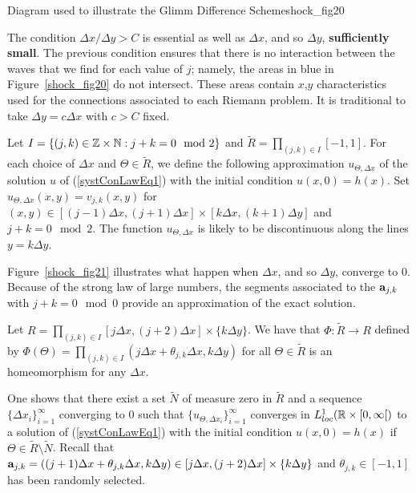 {Diagram used to illustrate the Glimm Difference Scheme}{shock_fig20}

The condition $\Delta x / \Delta y > C$ is essential as well as
$\Delta x$, and so $\Delta y$, {\bfseries sufficiently small}.
The previous condition ensures that there is no interaction between
the waves that we find for each value of $j$; namely, the areas
in blue in Figure~\ref{shock_fig20} do not intersect.  These areas contain
$x$,$y$ characteristics used for the connections associated to each
Riemann problem.  It is traditional to take $\Delta y = c \Delta x$ with
$c>C$ fixed.

Let $I = \{ (j,k) \in \mathbb{Z} \times \mathbb{N} : j+k = 0 \mod{2} \}$ and
$\displaystyle \tilde{R} = \prod_{(j,k) \in I} [-1,1]$.
For each choice of $\Delta x$ and $\Theta \in \tilde{R}$, we
define the following approximation $u_{\Theta, \Delta x}$ of the solution $u$ of
(\ref{systConLawEq1}) with the initial condition $u(x,0) = h(x)$.
Set $u_{\Theta,\Delta x}(x,y) = v_{j,k}(x,y)$ for
$(x,y) \in [(j-1)\Delta x, (j+1)\Delta x]\times [k\Delta x,(k+1)\Delta y]$
and $j+k = 0 \mod{2}$.  The function $u_{\Theta,\Delta x}$ is likely
to be discontinuous along the lines $y = k \Delta y$.

Figure~\ref{shock_fig21} illustrates what happen when $\Delta x$, and
so $\Delta y$, converge to $0$.  Because of the strong law of large numbers,
the segments associated to the $\mathbf{a}_{j,k}$ with $j+k =0 \mod{0}$
provide an approximation of the exact solution.


Let $\displaystyle R = \prod_{(j,k) \in I} [j\Delta x,(j+2) \Delta x]
\times \{k \Delta y\}$.  We have that $\Phi:\tilde{R} \to R$
defined by $\displaystyle \Phi(\Theta) =
\prod_{(j,k) \in I} (j\Delta x + \theta_{j,k} \Delta x, k \Delta y)$
for all $\Theta \in \tilde{R}$ is an homeomorphism 
for any $\Delta x$.

One shows that there exist a set $\tilde{N}$ of measure zero in
$\tilde{R}$ and a sequence $\displaystyle \{ \Delta x_i\}_{i=1}^\infty$
converging to $0$ such that
$\displaystyle \{u_{\Theta,\Delta x_i}\}_{i=1}^\infty$ converges in
$L^1_{loc}(\mathbb{R}\times [0,\infty[)$ to a solution of
(\ref{systConLawEq1}) with the initial condition $u(x,0) = h(x)$ if
$\Theta \in \tilde{R}\setminus \tilde{N}$.
Recall that
$\mathbf{a}_{j,k} = ((j+1)\Delta x + \theta_{j,k} \Delta x, k \Delta y)
\in [j\Delta x,(j+2) \Delta x] \times \{k \Delta y\}$
and $\theta_{j,k} \in [-1,1]$ has been randomly selected.

